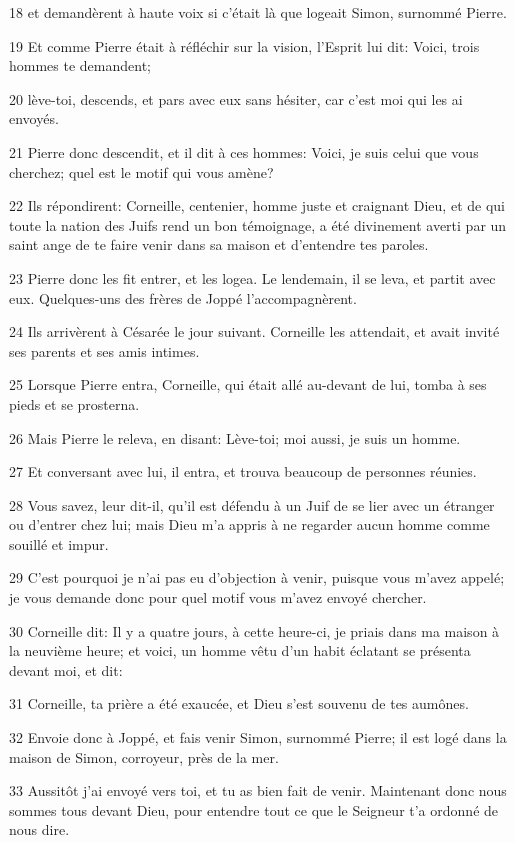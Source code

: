 \par 18 et demandèrent à haute voix si c'était là que logeait Simon, surnommé Pierre.
\par 19 Et comme Pierre était à réfléchir sur la vision, l'Esprit lui dit: Voici, trois hommes te demandent;
\par 20 lève-toi, descends, et pars avec eux sans hésiter, car c'est moi qui les ai envoyés.
\par 21 Pierre donc descendit, et il dit à ces hommes: Voici, je suis celui que vous cherchez; quel est le motif qui vous amène?
\par 22 Ils répondirent: Corneille, centenier, homme juste et craignant Dieu, et de qui toute la nation des Juifs rend un bon témoignage, a été divinement averti par un saint ange de te faire venir dans sa maison et d'entendre tes paroles.
\par 23 Pierre donc les fit entrer, et les logea. Le lendemain, il se leva, et partit avec eux. Quelques-uns des frères de Joppé l'accompagnèrent.
\par 24 Ils arrivèrent à Césarée le jour suivant. Corneille les attendait, et avait invité ses parents et ses amis intimes.
\par 25 Lorsque Pierre entra, Corneille, qui était allé au-devant de lui, tomba à ses pieds et se prosterna.
\par 26 Mais Pierre le releva, en disant: Lève-toi; moi aussi, je suis un homme.
\par 27 Et conversant avec lui, il entra, et trouva beaucoup de personnes réunies.
\par 28 Vous savez, leur dit-il, qu'il est défendu à un Juif de se lier avec un étranger ou d'entrer chez lui; mais Dieu m'a appris à ne regarder aucun homme comme souillé et impur.
\par 29 C'est pourquoi je n'ai pas eu d'objection à venir, puisque vous m'avez appelé; je vous demande donc pour quel motif vous m'avez envoyé chercher.
\par 30 Corneille dit: Il y a quatre jours, à cette heure-ci, je priais dans ma maison à la neuvième heure; et voici, un homme vêtu d'un habit éclatant se présenta devant moi, et dit:
\par 31 Corneille, ta prière a été exaucée, et Dieu s'est souvenu de tes aumônes.
\par 32 Envoie donc à Joppé, et fais venir Simon, surnommé Pierre; il est logé dans la maison de Simon, corroyeur, près de la mer.
\par 33 Aussitôt j'ai envoyé vers toi, et tu as bien fait de venir. Maintenant donc nous sommes tous devant Dieu, pour entendre tout ce que le Seigneur t'a ordonné de nous dire.
